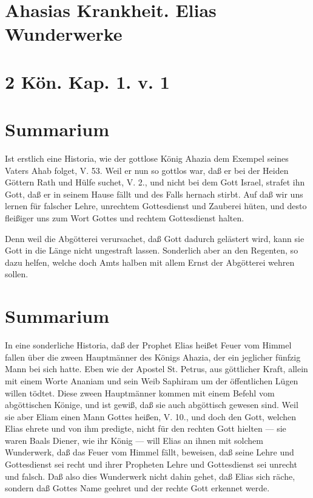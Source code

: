\section{Ahasias Krankheit. Elias Wunderwerke}

\section{2 Kön. Kap. 1. v. 1}

\section{Summarium}

Ist erstlich eine Historia, wie der gottlose König Ahazia dem Exempel seines Vaters Ahab folget, V. 53. Weil er nun so gottlos war, daß er bei der Heiden Göttern Rath und Hülfe suchet, V. 2., und nicht bei dem Gott Israel, strafet ihn Gott, daß er in seinem Hause fällt und des Falls hernach stirbt. Auf daß wir uns lernen für falscher Lehre, unrechtem Gottesdienst und Zauberei hüten, und desto fleißiger uns zum Wort Gottes und rechtem Gottesdienst halten.

Denn weil die Abgötterei verursachet, daß Gott dadurch gelästert wird, kann sie Gott in die Länge nicht ungestraft lassen. Sonderlich aber an den Regenten, so dazu helfen, welche doch Amts halben mit allem Ernst der Abgötterei wehren sollen.

\section{Summarium}

In eine sonderliche Historia, daß der Prophet Elias heißet Feuer vom Himmel fallen über die zween Hauptmänner des Königs Ahazia, der ein jeglicher fünfzig Mann bei sich hatte. Eben wie der Apostel St. Petrus, aus göttlicher Kraft, allein mit einem Worte Ananiam und sein Weib Saphiram um der öffentlichen Lügen willen tödtet. Diese zween Hauptmänner kommen mit einem Befehl vom abgöttischen Könige, und ist gewiß, daß sie auch abgöttisch gewesen sind. Weil sie aber Eliam einen Mann Gottes heißen, V. 10., und doch den Gott, welchen Elias ehrete und von ihm predigte, nicht für den rechten Gott hielten — sie waren Baals Diener, wie ihr König — will Elias an ihnen mit solchem Wunderwerk, daß das Feuer vom Himmel fällt, beweisen, daß seine Lehre und Gottesdienst sei recht und ihrer Propheten Lehre und Gottesdienst sei unrecht und falsch. Daß also dies Wunderwerk nicht dahin gehet, daß Elias sich räche, sondern daß Gottes Name geehret und der rechte Gott erkennet werde.


